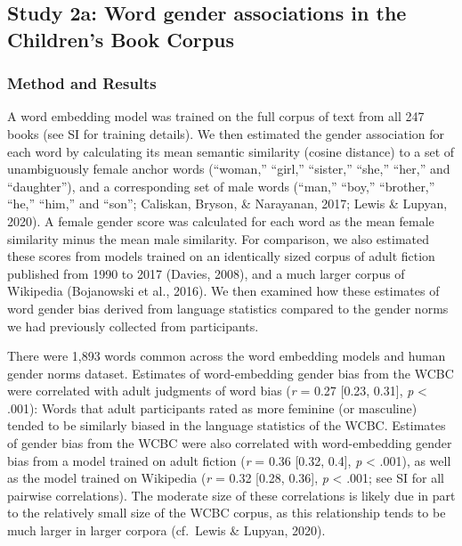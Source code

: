 \documentclass[
  english,
  ,man,floatsintext]{apa6}
\begin{document}
\hypertarget{study-2a-word-gender-associations-in-the-childrens-book-corpus}{%
\subsection{Study 2a: Word gender associations in the Children's Book Corpus}\label{study-2a-word-gender-associations-in-the-childrens-book-corpus}}

\hypertarget{method-and-results-1}{%
\subsubsection{Method and Results}\label{method-and-results-1}}

A word embedding model was trained on the full corpus of text from all 247 books (see SI for training details). We then estimated the gender association for each word by calculating its mean semantic similarity (cosine distance) to a set of unambiguously female anchor words (\enquote{woman,} \enquote{girl,} \enquote{sister,} \enquote{she,} \enquote{her,} and \enquote{daughter}), and a corresponding set of male words (``man,'' ``boy,'' ``brother,'' ``he,'' ``him,'' and ``son''; Caliskan, Bryson, \& Narayanan, 2017; Lewis \& Lupyan, 2020). A female gender score was calculated for each word as the mean female similarity minus the mean male similarity. For comparison, we also estimated these scores from models trained on an identically sized corpus of adult fiction published from 1990 to 2017 (Davies, 2008), and a much larger corpus of Wikipedia (Bojanowski et al., 2016). We then examined how these estimates of word gender bias derived from language statistics compared to the gender norms we had previously collected from participants.

There were 1,893 words common across the word embedding models and human gender norms dataset. Estimates of word-embedding gender bias from the WCBC were correlated with adult judgments of word bias (\emph{r} = 0.27 {[}0.23, 0.31{]}, \emph{p} \textless{} .001): Words that adult participants rated as more feminine (or masculine) tended to be similarly biased in the language statistics of the WCBC. Estimates of gender bias from the WCBC were also correlated with word-embedding gender bias from a model trained on adult fiction (\emph{r} = 0.36 {[}0.32, 0.4{]}, \emph{p} \textless{} .001), as well as the model trained on Wikipedia (\emph{r} = 0.32 {[}0.28, 0.36{]}, \emph{p} \textless{} .001; see SI for all pairwise correlations). The moderate size of these correlations is likely due in part to the relatively small size of the WCBC corpus, as this relationship tends to be much larger in larger corpora (cf.~Lewis \& Lupyan, 2020).
\end{document}
